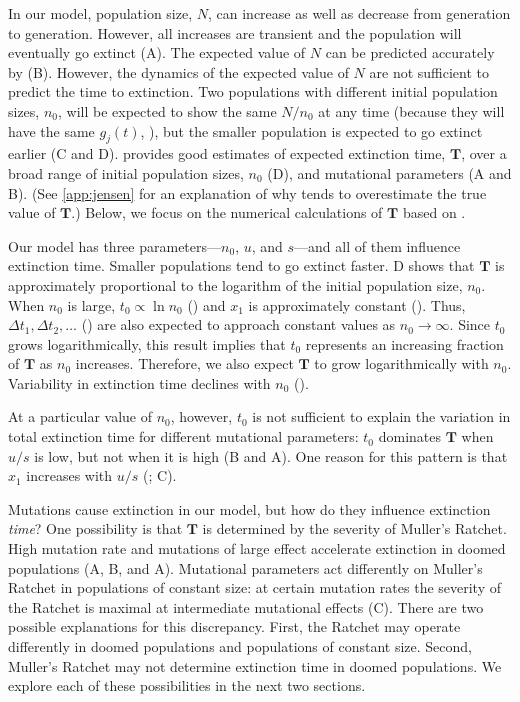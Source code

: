 \documentclass[9pt,lineno]{elife}
\begin{document}
In our model, population size, $N$, can increase as well as decrease from generation to generation.  However, all increases are transient and the population will eventually go extinct (A).  The expected value of $N$ can be predicted accurately by  (B).  However, the dynamics of the expected value of $N$ are not sufficient to predict the time to extinction.  Two populations with different initial population sizes, $n_0$, will be expected to show the same $N/n_0$ at any time (because they will have the same $g_j(t)$, ), but the smaller population is expected to go extinct earlier (C and D).   provides good estimates of expected extinction time, $\mathbf{T}$, over a broad range of initial population sizes, $n_0$ (D), and mutational parameters (A and B).  
(See \autoref{app:jensen} for an explanation of why  tends to overestimate the true value of $\mathbf{T}$.)  
Below, we focus on the numerical calculations of $\mathbf{T}$ based on .

Our model has three parameters---$n_0$, $u$, and $s$---and all of them influence extinction time.  Smaller populations tend to go extinct faster.  D shows that $\mathbf{T}$ is approximately proportional to the logarithm of the initial population size, $n_0$.  
%
When $n_0$ is large, $t_0 \propto \ln n_0$ () and $x_1$ is approximately constant ().
Thus, 
$\Delta t_1, \Delta t_2, \ldots$ ()
are also expected to approach constant values as $n_0\to\infty$.  Since
$t_0$ grows logarithmically, this result implies that $t_0$ represents an increasing fraction of $\mathbf{T}$ as $n_0$ increases. 
Therefore, we also expect $\mathbf{T}$ to grow logarithmically with $n_0$. 
Variability in extinction time declines with $n_0$ ().

At a particular value of $n_0$, however, $t_0$ is not sufficient to explain the variation in total extinction time for different mutational parameters: 
$t_0$ dominates $\mathbf{T}$ when $u/s$ is low, but not when it is high (B and A).  One reason for this pattern is that $x_1$ increases with $u/s$ (; C).

Mutations cause extinction in our model, but how do they influence extinction \textit{time}?  
%
One possibility is that $\mathbf{T}$ is determined by the severity of Muller's Ratchet. High mutation rate and mutations of large effect accelerate extinction in doomed populations (A, B, and A).  Mutational parameters act differently on Muller's Ratchet in populations of constant size: at certain mutation rates the severity of the Ratchet is maximal at intermediate mutational effects \citep{Gabriel_MULLER_1993, Gordo_On_2000, gor00b} (C).
%
There are two possible explanations for this discrepancy.  
%
First, the Ratchet may operate differently in doomed populations and populations of constant size. 
%
Second, Muller's Ratchet may not determine extinction time in doomed populations.  
%
We explore each of these possibilities in the next two sections.  
\end{document}
